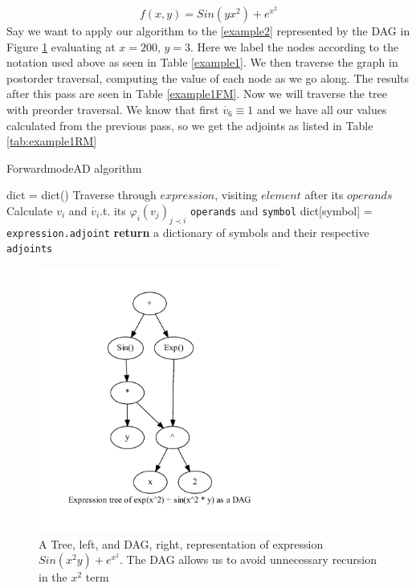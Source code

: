 \documentclass{article}
\begin{document}
\begin{equation}
    \label{example2}
    f(x,y) = Sin(yx^2) + e^{x^2}
\end{equation}
Say we want to apply our algorithm to the \ref{example2} represented by the DAG in Figure \ref{fig:DAGgraph} evaluating at $x=200$, $y=3$. Here we label the nodes according to the notation used above as seen in Table \ref{example1}. We then traverse the graph in postorder traversal, computing the value of each node as we go along. The results after this pass are seen in Table \ref{example1FM}. Now we will traverse the tree with preorder traversal. We know that first $\dot{v_6} \equiv 1$ and we have all our values calculated from the previous pass, so we get the adjoints as listed in Table \ref{tab:example1RM}

\begin{algorithm}[h]
\caption{ForwardmodeAD algorithm}\label{forwardAD}
\begin{algorithmic}[1]
\State dict = dict()\Comment{}
\State Traverse through $expression$, visiting $element$ after its $operands$
    \State Calculate $v_i$ and $\Dot{v_i}$.t. its $\varphi_i(v_j)_{j \prec i}$ \verb|operands| and \verb|symbol|
    \State dict[symbol] = \verb|expression.adjoint|
    \EndFor
\EndFor
\State \textbf{return} a dictionary of symbols and their respective \verb|adjoints|
\EndProcedure
\end{algorithmic}
\end{algorithm}


\begin{figure}[h!]
    \includegraphics[width=8cm]{images/DAGgraph.gv.pdf}
    \caption{A Tree, left, and DAG, right, representation of expression $Sin(x^2y) + e^{x^2}$. The DAG allows us to avoid unnecessary recursion in the $x^2$ term}
    \label{fig:DAGgraph}
\end{figure}
\end{document}
